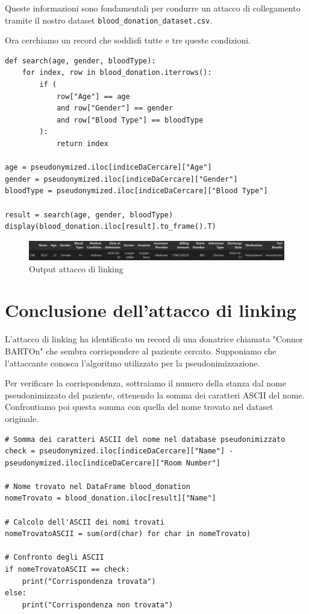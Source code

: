 Queste informazioni sono fondamentali per condurre un attacco di collegamento tramite il nostro dataset \texttt{blood\_donation\_dataset.csv}. 

Ora cerchiamo un record che soddisfi tutte e tre queste condizioni.\\

\begin{lstlisting}[caption={Attacco di linking}]
def search(age, gender, bloodType):
    for index, row in blood_donation.iterrows():
        if (
            row["Age"] == age
            and row["Gender"] == gender
            and row["Blood Type"] == bloodType
        ):
            return index
        
age = pseudonymized.iloc[indiceDaCercare]["Age"]
gender = pseudonymized.iloc[indiceDaCercare]["Gender"]
bloodType = pseudonymized.iloc[indiceDaCercare]["Blood Type"]

result = search(age, gender, bloodType)
display(blood_donation.iloc[result].to_frame().T)
\end{lstlisting}

\newpage

\begin{figure}[H]
    \centering
    \includegraphics[width=1.0\linewidth]{Images/Img5.png}
    \caption{Output attacco di linking}
\end{figure}

\section{Conclusione dell'attacco di linking}

L'attacco di linking ha identificato un record di una donatrice chiamata "Connor BARTOn" che sembra corrispondere al paziente cercato. Supponiamo che l'attaccante conosca l'algoritmo utilizzato per la pseudonimizzazione.

Per verificare la corrispondenza, sottraiamo il numero della stanza dal nome pseudonimizzato del paziente, ottenendo la somma dei caratteri ASCII del nome. Confrontiamo poi questa somma con quella del nome trovato nel dataset originale.\\

\begin{lstlisting}[caption={Conclusione attacco di linking}]
# Somma dei caratteri ASCII del nome nel database pseudonimizzato
check = pseudonymized.iloc[indiceDaCercare]["Name"] - pseudonymized.iloc[indiceDaCercare]["Room Number"]

# Nome trovato nel DataFrame blood_donation
nomeTrovato = blood_donation.iloc[result]["Name"]

# Calcolo dell'ASCII dei nomi trovati
nomeTrovatoASCII = sum(ord(char) for char in nomeTrovato)

# Confronto degli ASCII
if nomeTrovatoASCII == check:
    print("Corrispondenza trovata")
else:
    print("Corrispondenza non trovata")
\end{lstlisting}